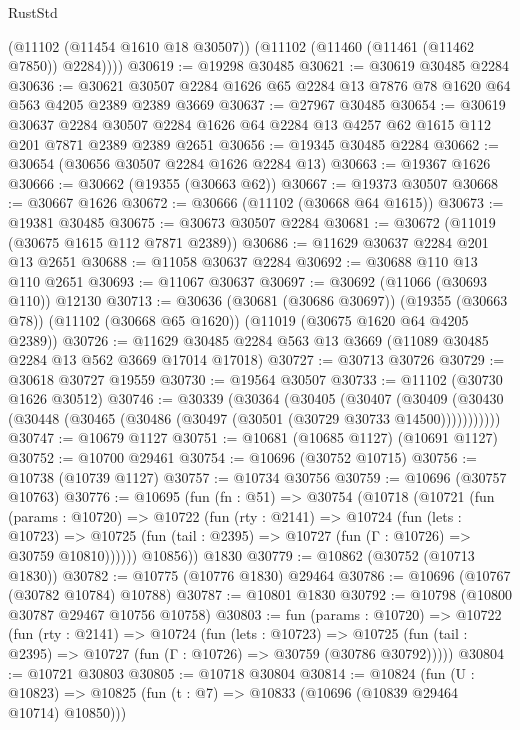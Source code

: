 \begin{lexlean}{RustStd}
\begin{coremodule}
        (@11102 (@11454 @1610 @18 @30507))
        (@11102 (@11460 (@11461 (@11462 @7850)) @2284))))
@30619 := @19298 @30485
@30621 := @30619 @30485 @2284
@30636 := @30621 @30507 @2284 @1626 @65 @2284 @13 @7876 @78 @1620 @64 @563 @4205 @2389 @2389 @3669
@30637 := @27967 @30485
@30654 := @30619
    @30637
    @2284
    @30507
    @2284
    @1626
    @64
    @2284
    @13
    @4257
    @62
    @1615
    @112
    @201
    @7871
    @2389
    @2389
    @2651
@30656 := @19345 @30485 @2284
@30662 := @30654 (@30656 @30507 @2284 @1626 @2284 @13)
@30663 := @19367 @1626
@30666 := @30662 (@19355 (@30663 @62))
@30667 := @19373 @30507
@30668 := @30667 @1626
@30672 := @30666 (@11102 (@30668 @64 @1615))
@30673 := @19381 @30485
@30675 := @30673 @30507 @2284
@30681 := @30672 (@11019 (@30675 @1615 @112 @7871 @2389))
@30686 := @11629 @30637 @2284 @201 @13 @2651
@30688 := @11058 @30637 @2284
@30692 := @30688 @110 @13 @110 @2651
@30693 := @11067 @30637
@30697 := @30692 (@11066 (@30693 @110)) @12130
@30713 := @30636
    (@30681 (@30686 @30697))
    (@19355 (@30663 @78))
    (@11102 (@30668 @65 @1620))
    (@11019 (@30675 @1620 @64 @4205 @2389))
@30726 := @11629 @30485 @2284 @563 @13 @3669 (@11089 @30485 @2284 @13 @562 @3669 @17014 @17018)
@30727 := @30713 @30726
@30729 := @30618 @30727 @19559
@30730 := @19564 @30507
@30733 := @11102 (@30730 @1626 @30512)
@30746 := @30339
    (@30364
      (@30405
        (@30407
          (@30409 (@30430 (@30448 (@30465 (@30486 (@30497 (@30501 (@30729 @30733 @14500)))))))))))
@30747 := @10679 @1127
@30751 := @10681 (@10685 @1127) (@10691 @1127)
@30752 := @10700 @29461
@30754 := @10696 (@30752 @10715)
@30756 := @10738 (@10739 @1127)
@30757 := @10734 @30756
@30759 := @10696 (@30757 @10763)
@30776 := @10695
    (fun (fn : @51) =>
    @30754
      (@10718
        (@10721
          (fun (params : @10720) =>
          @10722
            (fun (rty : @2141) =>
            @10724
              (fun (lets : @10723) =>
              @10725 (fun (tail : @2395) => @10727 (fun (Γ : @10726) => @30759 @10810))))))
        @10856))
    @1830
@30779 := @10862 (@30752 (@10713 @1830))
@30782 := @10775 (@10776 @1830) @29464
@30786 := @10696 (@10767 (@30782 @10784) @10788)
@30787 := @10801 @1830
@30792 := @10798 (@10800 @30787 @29467 @10756 @10758)
@30803 := fun (params : @10720) =>
  @10722
    (fun (rty : @2141) =>
    @10724
      (fun (lets : @10723) =>
      @10725 (fun (tail : @2395) => @10727 (fun (Γ : @10726) => @30759 (@30786 @30792)))))
@30804 := @10721 @30803
@30805 := @10718 @30804
@30814 := @10824
    (fun (U : @10823) => @10825 (fun (t : @7) => @10833 (@10696 (@10839 @29464 @10714) @10850)))

\end{coremodule}
\end{lexlean}
